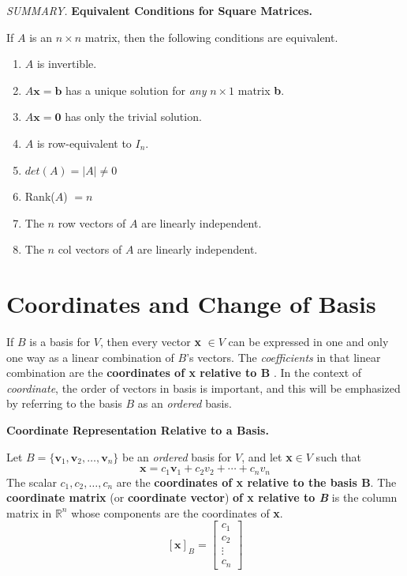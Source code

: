 \documentclass{article}
\newcommand\B{\textbf}
\newcommand\tcl{\begin{tcolorbox}[colback = {blue9}]}
\newcommand\etcl{\end{tcolorbox}}
\newcommand\x{\times}
\begin{document}
\begin{tcolorbox}
    \tcl
    \textit{SUMMARY.} \B{Equivalent Conditions for Square Matrices.}

    If $A$ is an $n \x n$ matrix, then the following conditions are equivalent.
    \begin{enumerate}
        \item $A$ is invertible.
        \item $A\B{x} = \B{b}$ has a unique solution for \textit{any} $n \x 1$ matrix \B{b}.
        \item $A\B{x} = \B{0}$ has only the trivial solution.
        \item $A$ is row-equivalent to $I_n$.
        \item $det(A) = |A| \ne 0$
        \item Rank($A$) $= n$
        \item The $n$ row vectors of $A$ are linearly independent.
        \item The $n$ col vectors of $A$ are linearly independent.
    \end{enumerate}
    \etcl 

    \section{Coordinates and Change of Basis}

    If $B$ is a basis for $V$, then every vector \B{x} $\in V$ can be expressed in one and only one way as
    a linear combination of $B$'s vectors. The \textit{coefficients} in that linear combination are the \B{
        coordinates of x relative to B
    }. In the context of \textit{coordinate}, the order of vectors in basis is important, and this will
    be emphasized by referring to the basis $B$ as an \textit{ordered} basis.

    \tcl
    \textbf{Coordinate Representation Relative to a Basis.}

    Let $B = \{\B{v}_1, \B{v}_2, \dots, \B{v}_n\}$ be an \textit{ordered} basis for $V$, and let \B{x}$\in V$ such that
    \[ \B{x} = c_1\B{v}_1 + c_2v_2 + \cdots + c_nv_n \]
    The scalar $c_1, c_2, \dots, c_n$ are the \B{coordinates of x relative to the basis B}. The \textbf{coordinate
    matrix} (or \textbf{coordinate vector}) \textbf{of x relative to \textit{B}} is the column matrix in $\mathbb{R}^n$ whose components
    are the coordinates of \B{x}.
    \[ [\B{x}]_B = \begin{bmatrix}
        c_1 \\ c_2 \\ \vdots \\ c_n 
    \end{bmatrix} \]
    \etcl 


\end{tcolorbox}
\end{document}
